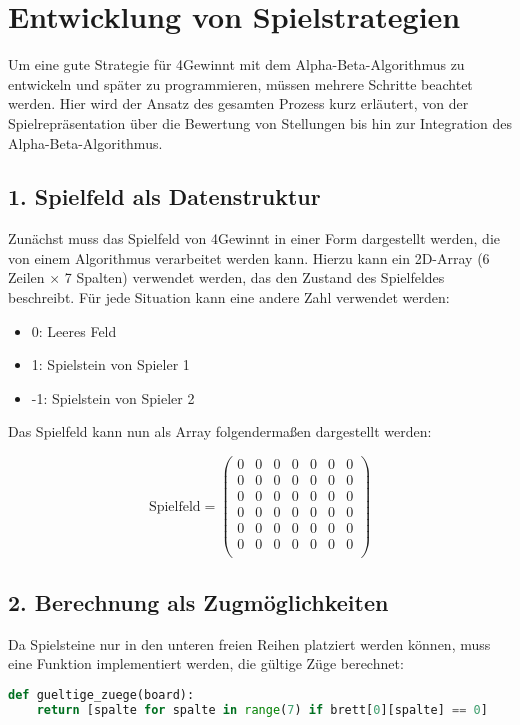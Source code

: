 \section{Entwicklung von Spielstrategien}
	
Um eine gute Strategie für 4Gewinnt mit dem Alpha-Beta-Algorithmus zu entwickeln und später zu programmieren, müssen mehrere Schritte beachtet werden. Hier wird der Ansatz des gesamten Prozess kurz erläutert, von der Spielrepräsentation über die Bewertung von Stellungen bis hin zur Integration des Alpha-Beta-Algorithmus.

\subsection*{1. Spielfeld als Datenstruktur}
Zunächst muss das Spielfeld von 4Gewinnt in einer Form dargestellt werden, die von einem Algorithmus verarbeitet werden kann.
Hierzu kann ein 2D-Array (6 Zeilen × 7 Spalten) verwendet werden, das den Zustand des Spielfeldes beschreibt. Für jede Situation kann eine andere Zahl verwendet werden:
\begin{itemize}
	\item 0: Leeres Feld
	\item 1: Spielstein von Spieler 1
	\item -1: Spielstein von Spieler 2
\end{itemize}

Das Spielfeld kann nun als Array folgendermaßen dargestellt werden:

\[
\text{Spielfeld} =
\begin{pmatrix}
	0 & 0 & 0 & 0 & 0 & 0 & 0 \\
	0 & 0 & 0 & 0 & 0 & 0 & 0 \\
	0 & 0 & 0 & 0 & 0 & 0 & 0 \\
	0 & 0 & 0 & 0 & 0 & 0 & 0 \\
	0 & 0 & 0 & 0 & 0 & 0 & 0 \\
	0 & 0 & 0 & 0 & 0 & 0 & 0 \\
\end{pmatrix}
\]

\subsection*{2. Berechnung als Zugmöglichkeiten }
Da Spielsteine nur in den unteren freien Reihen platziert werden können, muss eine Funktion implementiert werden, die gültige Züge berechnet:

\begin{lstlisting}[language=Python, caption=Funktion zur Berechnung gültiger Züge]
	def gueltige_zuege(board):
	return [spalte for spalte in range(7) if brett[0][spalte] == 0]
\end{lstlisting}

